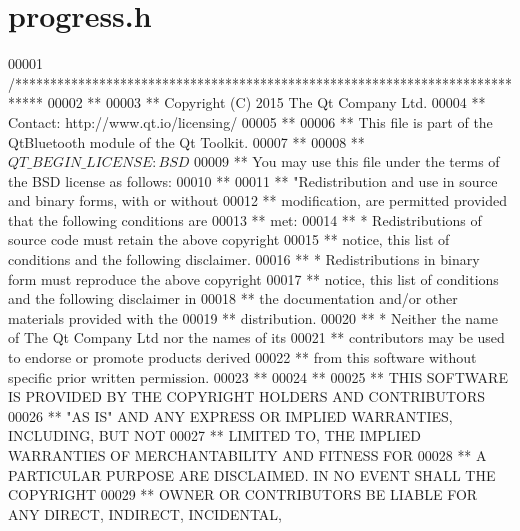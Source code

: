 \hypertarget{progress_8h_source}{}\section{progress.\+h}
\label{progress_8h_source}

\begin{DoxyCode}
00001 \textcolor{comment}{/****************************************************************************}
00002 \textcolor{comment}{**}
00003 \textcolor{comment}{** Copyright (C) 2015 The Qt Company Ltd.}
00004 \textcolor{comment}{** Contact: http://www.qt.io/licensing/}
00005 \textcolor{comment}{**}
00006 \textcolor{comment}{** This file is part of the QtBluetooth module of the Qt Toolkit.}
00007 \textcolor{comment}{**}
00008 \textcolor{comment}{** $QT\_BEGIN\_LICENSE:BSD$}
00009 \textcolor{comment}{** You may use this file under the terms of the BSD license as follows:}
00010 \textcolor{comment}{**}
00011 \textcolor{comment}{** "Redistribution and use in source and binary forms, with or without}
00012 \textcolor{comment}{** modification, are permitted provided that the following conditions are}
00013 \textcolor{comment}{** met:}
00014 \textcolor{comment}{**   * Redistributions of source code must retain the above copyright}
00015 \textcolor{comment}{**     notice, this list of conditions and the following disclaimer.}
00016 \textcolor{comment}{**   * Redistributions in binary form must reproduce the above copyright}
00017 \textcolor{comment}{**     notice, this list of conditions and the following disclaimer in}
00018 \textcolor{comment}{**     the documentation and/or other materials provided with the}
00019 \textcolor{comment}{**     distribution.}
00020 \textcolor{comment}{**   * Neither the name of The Qt Company Ltd nor the names of its}
00021 \textcolor{comment}{**     contributors may be used to endorse or promote products derived}
00022 \textcolor{comment}{**     from this software without specific prior written permission.}
00023 \textcolor{comment}{**}
00024 \textcolor{comment}{**}
00025 \textcolor{comment}{** THIS SOFTWARE IS PROVIDED BY THE COPYRIGHT HOLDERS AND CONTRIBUTORS}
00026 \textcolor{comment}{** "AS IS" AND ANY EXPRESS OR IMPLIED WARRANTIES, INCLUDING, BUT NOT}
00027 \textcolor{comment}{** LIMITED TO, THE IMPLIED WARRANTIES OF MERCHANTABILITY AND FITNESS FOR}
00028 \textcolor{comment}{** A PARTICULAR PURPOSE ARE DISCLAIMED. IN NO EVENT SHALL THE COPYRIGHT}
00029 \textcolor{comment}{** OWNER OR CONTRIBUTORS BE LIABLE FOR ANY DIRECT, INDIRECT, INCIDENTAL,}

\end{DoxyCode}
